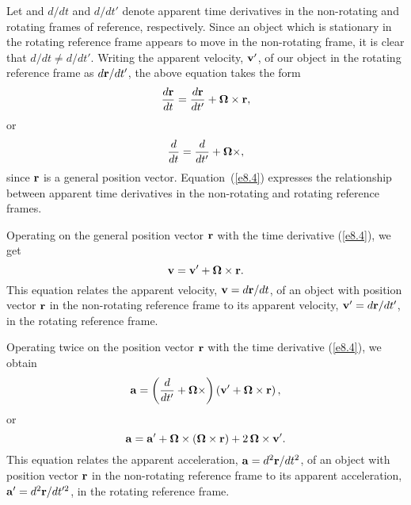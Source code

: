 Let and $d/dt$ and  $d/dt'$ denote apparent time derivatives in the non-rotating and rotating frames of reference, respectively. Since an object which is
stationary in the rotating reference frame appears to move in the non-rotating
frame, it is clear that $d/dt\neq d/dt'$. Writing the apparent velocity, ${\bf v}'$, 
of our object in the rotating reference frame as $d{\bf r}/dt'$, the above
equation takes the form
\begin{equation}\label{e8.3}
\frac{d{\bf r}}{dt} = \frac{d{\bf r}}{dt'}+\mbox{\boldmath$\Omega$}\times{\bf r},
\end{equation}
or
\begin{equation}\label{e8.4}
\frac{d}{dt} =\frac{d}{dt'}+ \mbox{\boldmath$\Omega$}\times,
\end{equation}
since ${\bf r}$ is a general position vector. Equation~(\ref{e8.4}) expresses the
relationship between  apparent time derivatives in the non-rotating and
rotating reference frames.

Operating on the general position vector ${\bf r}$ with the time derivative (\ref{e8.4}), we get
\begin{equation}
{\bf v} = {\bf v}' + \mbox{\boldmath$\Omega$}\times{\bf r}.
\end{equation}
This equation relates the apparent velocity, ${\bf v}=d{\bf r}/dt$, of an object with
position vector ${\bf r}$ in the non-rotating reference frame to its
apparent velocity, ${\bf v}' = d{\bf r}/dt'$, in the rotating reference frame.

Operating twice on the position vector ${\bf r}$ with the time
derivative (\ref{e8.4}), we obtain
\begin{equation}
{\bf a} = \left(\frac{d}{dt'}+ \mbox{\boldmath$\Omega$}\times\right)\left({\bf v}' + \mbox{\boldmath$\Omega$}\times{\bf r}\right),
\end{equation}
or
\begin{equation}\label{e8.6}
{\bf a} = {\bf a}' + \mbox{\boldmath$\Omega$}\times(\mbox{\boldmath$\Omega$}\times{\bf r}) + 2\,\mbox{\boldmath$\Omega$}\times{\bf v}'.
\end{equation}
This equation relates the apparent acceleration, ${\bf a}= d^2{\bf r}/dt^2$, of an object with
position vector ${\bf r}$ in the non-rotating reference frame to its
apparent acceleration, ${\bf a}'= d^2{\bf r}/dt'^2$, in the rotating reference frame.

